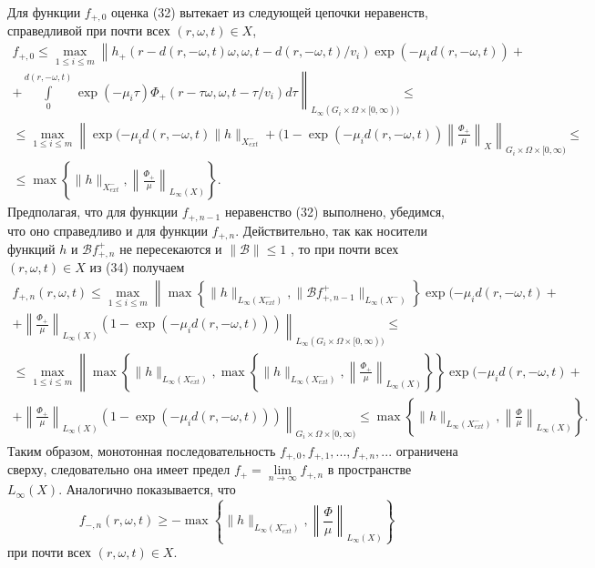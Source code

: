\documentclass[12pt,reqno]{report}
\begin{document}
Для функции $f_{+,0}$ оценка (32) вытекает из следующей цепочки
неравенств, справедливой при почти всех $(r,\omega,t)\in X$,
\begin{multline}
f_{+,0} \leq \max \limits_{1\leq i \leq m} \left \|
h_{+}(r-d(r,-\omega,t)\omega,\omega,t-d(r,-\omega,t)/v_i) \exp \left(-
\mu_i d(r,-\omega,t)\right) + \right.
\\
\left. +
\int \limits_0^{d(r,-\omega,t)} \exp \left(- \mu_i \tau
\right)
\Phi_+(r-\tau\omega,\omega,t-\tau/v_i) d\tau \right \|_{L_{\infty}(G_i \times \Omega \times [0,\infty))}
\leq \\
\leq \max \limits_{1\leq i \leq m} \left \| \exp (- \mu_i
d(r,-\omega,t) \|h\|_{X^-_{ext}} + (1- \exp (- \mu_i
d(r,-\omega,t)) \left\|\frac{\Phi_+}{\mu} \right\|_{X}
\right\|_{G_i \times \Omega \times [0,\infty)} \leq \\ \leq \max
\left\{\|h\|_{X^-_{ext}}, \left\|\frac{\Phi_+}{\mu} \right\|_{L_{\infty}(X)}
\right\}.
\end{multline}
Предполагая, что для функции $f_{+,n-1}$ неравенство (32)
выполнено, убедимся, что оно справедливо и для функции $f_{+,n}$.
Действительно, так как носители функций $h$ и ${\mathcal B} f^+_{+,n}$
не пересекаются и $\|{\mathcal B}\| \leq 1$ , то при почти всех
$(r,\omega,t)\in X$ из (34) получаем
\begin{multline}
f_{+,n}(r,\omega,t) \leq \max \limits _{1\leq i \leq m} \left\|
\max \left\{\|h\|_{L_{\infty}(X^-_{ext})}, \|\mathcal B f^+_{+,n-1}\|_{L_{\infty}(X^-)}
\right\} \exp (- \mu_i d(r,-\omega,t) + \right.
\\
\left.
+ \left\|\frac{\Phi_+}{\mu} \right\|_{L_{\infty}(X)}
\left(1-\exp (- \mu_i d(r,-\omega,t)) \right) \right\|_{L_{\infty}(G_i \times
	\Omega \times [0,\infty))} \leq \\ \leq
\max \limits _{1\leq i \leq m} \left\|
\max \left\{\|h\|_{L_{\infty}(X^-_{ext})}, \max \left\{\|h\|_{L_{\infty}(X^-_{ext})},
\left\|\frac{\Phi_+}{\mu} \right\|_{L_{\infty}(X)} \right\} \right\} \exp (-
\mu_i d(r,-\omega,t) + \right.
\\
\left.
+ \left\|\frac{\Phi_+}{\mu} \right\|_{L_{\infty}(X)}
\left(1-\exp (- \mu_i d(r,-\omega,t)) \right) \right\|_{G_i \times
	\Omega \times [0,\infty)} \leq \max \left\{\|h\|_{L_{\infty}(X^-_{ext})},
\left\|\frac{\Phi}{\mu} \right\|_{L_{\infty}(X)} \right\}.
\end{multline}
Таким образом, монотонная последовательность $f_{+,0},
f_{+,1},..., f_{+,n},...$ ограничена сверху, следовательно она
имеет предел $f_+=\lim \limits_{n \to \infty} f_{+,n}$ в
пространстве $L_{\infty} (X)$. Аналогично показывается, что
$$
f_{-,n}(r,\omega,t) \geq -\max \left\{\|h\|_{L_{\infty}(X^-_{ext})},
\left\|\frac{\Phi}{\mu} \right\|_{L_{\infty}(X )}\right\}
$$
при почти всех $(r,\omega,t)\in X$.
\end{document}
